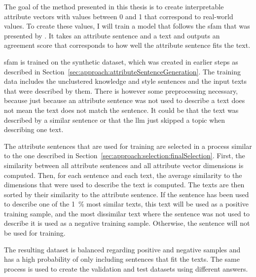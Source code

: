 The goal of the method presented in this thesis is to create interpretable attribute vectors with values between \num{0} and \num{1} that correspond to real-world values. To create these values, I will train a model that follows the \acf{sfam} that was presented by \citet{patelLearningInterpretableStyle2023}. It takes an attribute sentence and a text and outputs an agreement score that corresponds to how well the attribute sentence fits the text.

\ac{sfam} is trained on the synthetic dataset, which was created in earlier steps as described in Section~\ref{sec:approach:attributeSentenceGeneration}. The training data includes the unclustered knowledge and style sentences and the input texts that were described by them. There is however some preprocessing necessary, because just because an attribute sentence was not used to describe a text does not mean the text does not match the sentence. It could be that the text was described by a similar sentence or that the \ac{llm} just skipped a topic when describing one text.

The attribute sentences that are used for training are selected in a process similar to the one described in Section~\ref{sec:approach:selection:finalSelection}.
First, the similarity between all attribute sentences and all attribute vector dimensions is computed. Then, for each sentence and each text, the average similarity to the dimensions that were used to describe the text is computed. The texts are then sorted by their similarity to the attribute sentence. If the sentence has been used to describe one of the \SI{1}{\percent} most similar texts, this text will be used as a positive training sample, and the most dissimilar text where the sentence was not used to describe it is used as a negative training sample. Otherwise, the sentence will not be used for training.

The resulting dataset is balanced regarding positive and negative samples and has a high probability of only including sentences that fit the texts. %
The same process is used to create the validation and test datasets using different answers. %

